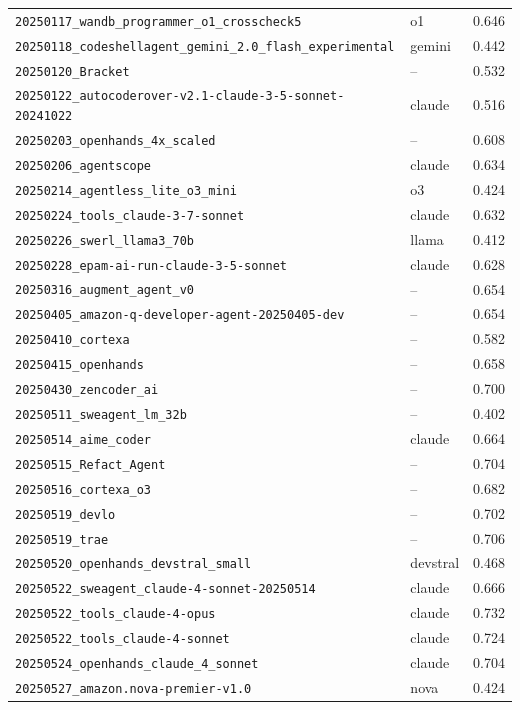 \begin{center}
\begin{longtable}{llc}
\texttt{20250117\_wandb\_programmer\_o1\_crosscheck5} & o1 & 0.646 \\
\texttt{20250118\_codeshellagent\_gemini\_2.0\_flash\_experimental} & gemini & 0.442 \\
\texttt{20250120\_Bracket} & -- & 0.532 \\
\texttt{20250122\_autocoderover-v2.1-claude-3-5-sonnet-20241022} & claude & 0.516 \\
\texttt{20250203\_openhands\_4x\_scaled} & -- & 0.608 \\
\texttt{20250206\_agentscope} & claude & 0.634 \\
\texttt{20250214\_agentless\_lite\_o3\_mini} & o3 & 0.424 \\
\texttt{20250224\_tools\_claude-3-7-sonnet} & claude & 0.632 \\
\texttt{20250226\_swerl\_llama3\_70b} & llama & 0.412 \\
\texttt{20250228\_epam-ai-run-claude-3-5-sonnet} & claude & 0.628 \\
\texttt{20250316\_augment\_agent\_v0} & -- & 0.654 \\
\texttt{20250405\_amazon-q-developer-agent-20250405-dev} & -- & 0.654 \\
\texttt{20250410\_cortexa} & -- & 0.582 \\
\texttt{20250415\_openhands} & -- & 0.658 \\
\texttt{20250430\_zencoder\_ai} & -- & 0.700 \\
\texttt{20250511\_sweagent\_lm\_32b} & -- & 0.402 \\
\texttt{20250514\_aime\_coder} & claude & 0.664 \\
\texttt{20250515\_Refact\_Agent} & -- & 0.704 \\
\texttt{20250516\_cortexa\_o3} & -- & 0.682 \\
\texttt{20250519\_devlo} & -- & 0.702 \\
\texttt{20250519\_trae} & -- & 0.706 \\
\texttt{20250520\_openhands\_devstral\_small} & devstral & 0.468 \\
\texttt{20250522\_sweagent\_claude-4-sonnet-20250514} & claude & 0.666 \\
\texttt{20250522\_tools\_claude-4-opus} & claude & 0.732 \\
\texttt{20250522\_tools\_claude-4-sonnet} & claude & 0.724 \\
\texttt{20250524\_openhands\_claude\_4\_sonnet} & claude & 0.704 \\
\texttt{20250527\_amazon.nova-premier-v1.0} & nova & 0.424 \\

\end{longtable}
\end{center}
